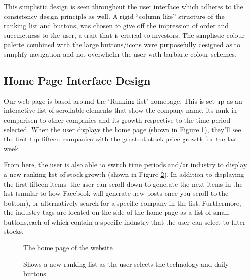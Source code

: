\documentclass[11pt]{article}
\numberwithin{figure}{section}
\begin{document}
        \bigskip
        \noindent
        This simplistic design is seen throughout the user interface which adheres to the consistency design principle as well. A rigid “column like” structure of the ranking list and buttons, was chosen to give off the impression of order and succinctness to the user, a trait that is critical to investors. The simplistic colour palette combined with the large buttons/icons were purposefully designed as to simplify navigation and not overwhelm the user with barbaric colour schemes. 
    
    \subsection{Home Page Interface Design}
        Our web page is based around the ‘Ranking list’ homepage. This is set up as an interactive list of scrollable elements that show the company name, its rank in comparison to other companies and its growth respective to the time period selected. When the user displays the home page (shown in Figure \ref{fig:listWire}), they’ll see the first top fifteen companies with the greatest stock price growth for the last week. 
        
        From here, the user is also able to switch time periods and/or industry to display a new ranking list of stock growth (shown in Figure \ref{fig:listDayWire}). In addition to displaying the first fifteen items, the user can scroll down to generate the next items in the list (similar to how Facebook will generate new posts once you scroll to the bottom), or alternatively search for a specific company in the list. Furthermore, the industry tags are located on the side of the home page as a list of small buttons,each of which contain a specific industry that the user can select to filter stocks.
        

        \begin{figure}[htp]
            \centering
            \caption{The home page of the website}
            \label{fig:listWire}
        \end{figure}
        \clearpage
        
        \begin{figure}[htp]
            \centering
            \caption{Shows a new ranking list as the user selects the technology and daily buttons}
            \label{fig:listDayWire}
        \end{figure}
        
\end{document}

